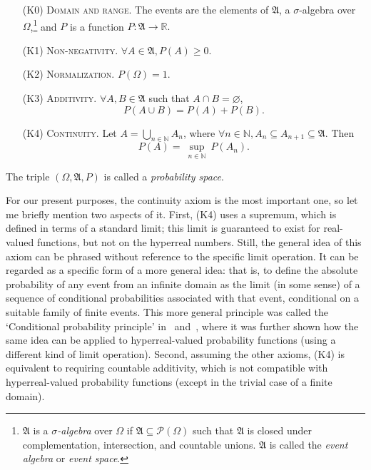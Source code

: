 \begin{itemize}
\item[(K0)] \textsc{Domain and range. }The events are the elements of $\mathfrak{A}$, a $\sigma$-algebra over $\Omega$,\footnote{$\mathfrak{A}$ is a \textit{$\sigma$-algebra} over $\Omega$ if $\mathfrak{A} \subseteq \mathcal{P}\left( \Omega \right)$ such that $\mathfrak{A}$ is closed under complementation, intersection, and countable unions. $\mathfrak{A}$ is called the \textit{event algebra} or \textit{event space}.} and $P$ is a function $P:\mathfrak{A} \rightarrow \mathbb{R}.$

\item[(K1)] \textsc{Non-negativity. } $\forall A\in \mathfrak{A}, P(A)\geq 0.$

\item[(K2)] \textsc{Normalization.} $P(\Omega )=1.$

\item[(K3)] \textsc{Additivity. } $\forall A, B \in \mathfrak{A}$ such that $A\cap B=\varnothing$,
$$P(A\cup B)=P(A)+P(B).$$

\item[(K4)] \textsc{Continuity.} Let $ A=\bigcup\limits_{n\in \mathbb{N}}A_{n}$,
where $\forall n\in \mathbb{N},A_{n}\subseteq A_{n+1}\subseteq \mathfrak{A}$. Then
$$ P(A)=\ \underset{n\in \mathbb{N}}{\sup }\ P(A_{n}). $$
\end{itemize}
The triple $(\Omega, \mathfrak{A}, P)$ is called a \textit{probability space}.

For our present purposes, the continuity axiom is the most important one, so let me briefly mention two aspects of it. First, (K4) uses a supremum, which is defined in terms of a standard limit; this limit is guaranteed to exist for real-valued functions, but not on the hyperreal numbers. Still, the general idea of this axiom can be phrased without reference to the specific limit operation. It can be regarded as a specific form of a more general idea: that is, to define the absolute probability of any event from an infinite domain as the limit (in some sense) of a sequence of conditional probabilities associated with that event, conditional on a suitable family of finite events. This more general principle was called the `Conditional probability principle' in~\citet[section~3.2]{Benci_etal:2013} and~\citet[section~3.2]{Benci_etal:2018}, where it was further shown how the same idea can be applied to hyperreal-valued probability functions (using a different kind of limit operation).
Second, assuming the other axioms, (K4) is equivalent to requiring countable additivity, which is not compatible with hyperreal-valued probability functions (except in the trivial case of a finite domain).

